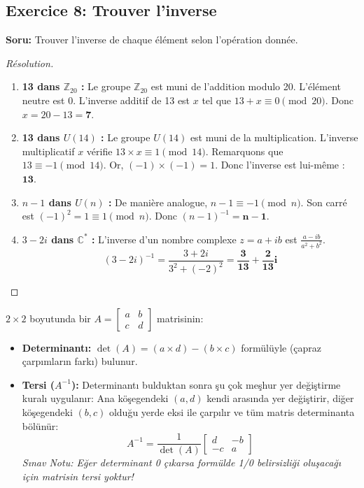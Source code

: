 \documentclass[12pt,a4paper]{report}
\begin{document}
\subsection*{Exercice 8: Trouver l'inverse}
\textbf{Soru:} Trouver l'inverse de chaque élément selon l'opération donnée.
\begin{proof}[Résolution]
\begin{enumerate}
    \item[(a)] \textbf{13 dans $\mathbb{Z}_{20}$ :} Le groupe $\mathbb{Z}_{20}$ est muni de l'addition modulo 20. L'élément neutre est $0$. L'inverse additif de 13 est $x$ tel que $13 + x \equiv 0 \pmod{20}$. Donc $x = 20 - 13 = \mathbf{7}$.
    \item[(b)] \textbf{13 dans $U(14)$ :} Le groupe $U(14)$ est muni de la multiplication. L'inverse multiplicatif $x$ vérifie $13 \times x \equiv 1 \pmod{14}$. Remarquons que $13 \equiv -1 \pmod{14}$. Or, $(-1) \times (-1) = 1$. Donc l'inverse est lui-même : $\mathbf{13}$.
    \item[(c)] \textbf{$n-1$ dans $U(n)$ :} De manière analogue, $n-1 \equiv -1 \pmod n$. Son carré est $(-1)^2 = 1 \equiv 1 \pmod n$. Donc $(n-1)^{-1} = \mathbf{n-1}$.
    \item[(d)] \textbf{$3-2i$ dans $\mathbb{C}^*$ :} L'inverse d'un nombre complexe $z = a+ib$ est $\frac{a-ib}{a^2+b^2}$. 
    \[ (3-2i)^{-1} = \frac{3+2i}{3^2 + (-2)^2} = \mathbf{\frac{3}{13} + \frac{2}{13}i} \]
\end{enumerate}
\end{proof}

\begin{tcolorbox}[colback=red!5!white,colframe=red!75!black,title=Hatırlatma: 2x2 Matrisin Determinantı ve Tersi ($A^{-1}$)]
$2 \times 2$ boyutunda bir $A = \begin{bmatrix} a & b \\ c & d \end{bmatrix}$ matrisinin:
\begin{itemize}
    \item \textbf{Determinantı:} $\det(A) = (a \times d) - (b \times c)$ formülüyle (çapraz çarpımların farkı) bulunur.
    \item \textbf{Tersi ($A^{-1}$):} Determinantı bulduktan sonra şu çok meşhur yer değiştirme kuralı uygulanır: Ana köşegendeki $(a,d)$ kendi arasında yer değiştirir, diğer köşegendeki $(b,c)$ olduğu yerde eksi ile çarpılır ve tüm matris determinanta bölünür:
    \[ A^{-1} = \frac{1}{\det(A)} \begin{bmatrix} d & -b \\ -c & a \end{bmatrix} \]
    \textit{Sınav Notu: Eğer determinant 0 çıkarsa formülde 1/0 belirsizliği oluşacağı için matrisin tersi yoktur!}
\end{itemize}
\end{tcolorbox}
\end{document}
